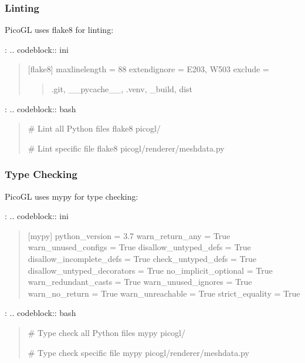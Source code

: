 \documentclass[a4paper,10pt,english,openany,oneside]{sphinxmanual}
\begin{document}
\subsubsection{Linting}
\label{\detokenize{development:linting}}
\sphinxAtStartPar
PicoGL uses flake8 for linting:

\sphinxAtStartPar
{}:
.. code\sphinxhyphen{}block:: ini
\begin{quote}

\sphinxAtStartPar
{[}flake8{]}
max\sphinxhyphen{}line\sphinxhyphen{}length = 88
extend\sphinxhyphen{}ignore = E203, W503
exclude =
\begin{quote}

\sphinxAtStartPar
.git,
\_\_pycache\_\_,
.venv,
\_build,
dist
\end{quote}
\end{quote}

\sphinxAtStartPar
{}:
.. code\sphinxhyphen{}block:: bash
\begin{quote}

\sphinxAtStartPar
\# Lint all Python files
flake8 picogl/

\sphinxAtStartPar
\# Lint specific file
flake8 picogl/renderer/meshdata.py
\end{quote}


\subsubsection{Type Checking}
\label{\detokenize{development:type-checking}}
\sphinxAtStartPar
PicoGL uses mypy for type checking:

\sphinxAtStartPar
{}:
.. code\sphinxhyphen{}block:: ini
\begin{quote}

\sphinxAtStartPar
{[}mypy{]}
python\_version = 3.7
warn\_return\_any = True
warn\_unused\_configs = True
disallow\_untyped\_defs = True
disallow\_incomplete\_defs = True
check\_untyped\_defs = True
disallow\_untyped\_decorators = True
no\_implicit\_optional = True
warn\_redundant\_casts = True
warn\_unused\_ignores = True
warn\_no\_return = True
warn\_unreachable = True
strict\_equality = True
\end{quote}

\sphinxAtStartPar
{}:
.. code\sphinxhyphen{}block:: bash
\begin{quote}

\sphinxAtStartPar
\# Type check all Python files
mypy picogl/

\sphinxAtStartPar
\# Type check specific file
mypy picogl/renderer/meshdata.py
\end{quote}
\end{document}
